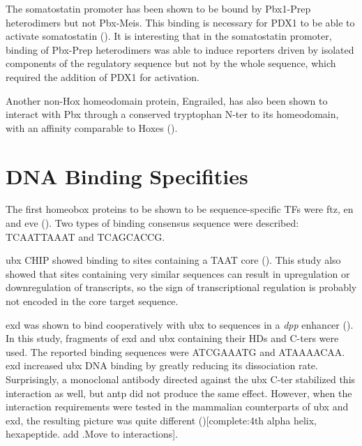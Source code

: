 The somatostatin promoter has been shown to be bound by Pbx1-Prep heterodimers but not Pbx-Meis. This binding is necessary for PDX1 to be able to activate somatostatin (\cite{Goudet1999}). It is interesting that in the somatostatin promoter, binding of Pbx-Prep heterodimers was able to induce reporters driven by isolated components of the regulatory sequence but not by the whole sequence, which required the addition of PDX1 for activation. 

Another non-Hox homeodomain protein, Engrailed, has also been shown to interact with Pbx through a conserved tryptophan \ac{N-ter} to its homeodomain, with an affinity comparable to Hoxes (\cite{Peltenburg1996}).





\section{DNA Binding Specifities}
\label{sec:specificites}
		
The first homeobox proteins to be shown to be sequence-specific \acp{TF} were \ac{ftz}, \ac{en} and \ac{eve} (\cite{Desplan1988,Hoey1988,Hoey1988a}). Two types of binding consensus sequence were described: TCAATTAAAT and TCAGCACCG.
		
\ac{ubx} \ac{CHIP} showed binding to sites containing a TAAT core (\cite{Gould1990}). This study also showed that sites containing very similar sequences can result in upregulation or downregulation of transcripts, so the sign of transcriptional regulation is probably not encoded in the core target sequence.


\ac{exd} was shown to bind cooperatively with \ac{ubx} to sequences in a \textit{dpp} enhancer (\cite{Chan1994}). In this study, fragments of \ac{exd} and \ac{ubx} containing their \acp{HD} and \acp{C-ter} were used. The reported binding sequences were ATCGAAATG and ATAAAACAA. \ac{exd} increased \ac{ubx} DNA binding by greatly reducing its dissociation rate. Surprisingly, a monoclonal antibody directed against the \ac{ubx} \ac{C-ter} stabilized this interaction as well, but \ac{antp} did not produce the same effect. However, when the interaction requirements were tested in the mammalian counterparts of \ac{ubx} and \ac{exd}, the resulting picture was quite different (\cite{Chang1995})[complete:4th alpha helix, hexapeptide. add \cite{Lu1996}.Move to interactions].

